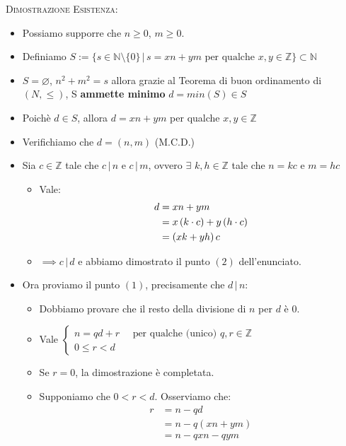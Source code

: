 \documentclass[10pt]{article}
\begin{document}
\textsc{Dimostrazione Esistenza:}
\begin{itemize}
\item
Possiamo supporre che $n \geq 0$, $m \geq 0$.
\item
Definiamo $S := \{s \in \mathbb{N} \setminus \{0\} \,|\, s = xn + ym \textrm{ per qualche } x,y \in \mathbb{Z} \} \subset \mathbb{N}$
\item
$S = \varnothing$, $n^2 + m^2 = s$ allora grazie al Teorema di buon ordinamento di $(N, \leq)$, S \textbf{ammette minimo} $d=min(S) \in S$
\item
Poichè $d \in S$, allora $d = xn + ym$ per qualche $x,y \in \mathbb{Z}$
\item
Verifichiamo che $d = (n,m)$ (M.C.D.)
\item
Sia $c \in \mathbb{Z}$ tale che $c \,|\, n$ e $c \,|\, m$, ovvero $\exists \,\, k,h \in \mathbb{Z}$ tale che $n = kc$ e $m = hc$
\begin{itemize}
\item
Vale:
\begin{equation}
\begin{split}
d &= xn + ym \\
&= x \left(k \cdot c \right) + y \left(h \cdot c \right) \\
&= \left(xk + yh \right) c
\notag
\end{split}
\end{equation}
\item
$\implies c \,|\, d$ e abbiamo dimostrato il punto $(2)$ dell'enunciato.
\end{itemize}
\item
Ora proviamo il punto $(1)$, precisamente che $d\,|\,n$:
\begin{itemize}
\item
Dobbiamo provare che il resto della divisione di $n$ per $d$ è $0$.
\item
Vale $\begin{cases} n = qd + r \quad \textrm{ per qualche (unico) } q,r \in \mathbb{Z} \\ 0 \leq r < d
\end{cases}$
\item
Se $r=0$, la dimostrazione è completata.
\item
Supponiamo che $0 < r < d$. Osserviamo che:
\begin{equation}
\begin{split}
r &= n - qd \\
&= n - q(xn + ym) \\
&= n - qxn - qym \\

\end{split}
\end{equation}
\end{itemize}
\end{itemize}
\end{document}
